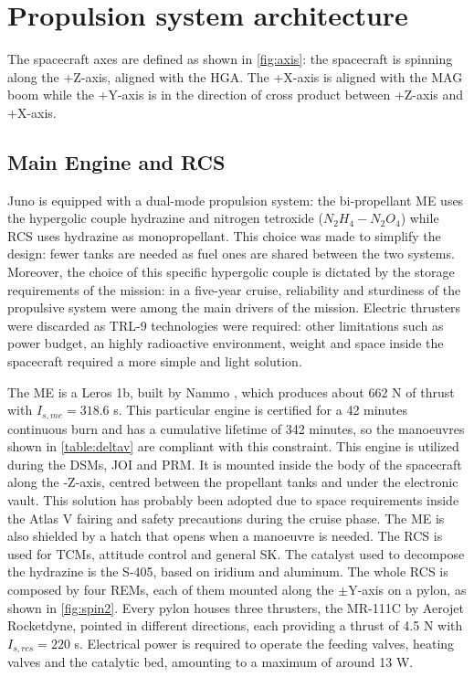 \section{Propulsion system architecture}
\label{sec:prop_architecture}

The spacecraft axes are defined as shown in \autoref{fig:axis}: the spacecraft is spinning along the +Z-axis, aligned with the HGA. The +X-axis is aligned with the MAG boom while the +Y-axis is in the direction of cross product between +Z-axis and +X-axis.


\subsection{Main Engine and RCS}
\label{subsec:me_rcs}

Juno is equipped with a dual-mode propulsion system: the bi-propellant ME uses the hypergolic couple hydrazine and nitrogen tetroxide ($N_2H_4 - N_2O_4$) while RCS uses hydrazine as monopropellant. This choice was made to simplify the design: fewer tanks are needed as fuel ones are shared between the two systems. Moreover, the choice of this specific hypergolic couple is dictated by the storage requirements of the mission: in a five-year cruise, reliability and sturdiness of the propulsive system were among the main drivers of the mission. Electric thrusters were discarded as TRL-9 technologies were required: other limitations such as power budget, an highly radioactive environment, weight and space inside the spacecraft required a more simple and light solution. 

The ME is a Leros 1b, built by Nammo \cite{Leros}, which produces about 662 N of thrust with $I_{s,me} = 318.6$ s. This particular engine is certified for a 42 minutes continuous burn and has a cumulative lifetime of 342 minutes, so the manoeuvres shown in \autoref{table:deltav} are compliant with this constraint. This engine is utilized during the DSMs, JOI and PRM. It is mounted inside the body of the spacecraft along the -Z-axis, centred between the propellant tanks and under the electronic vault. This solution has probably been adopted due to space requirements inside the Atlas V fairing and safety precautions during the cruise phase. The ME is also shielded by a hatch that opens when a manoeuvre is needed.
The RCS is used for TCMs, attitude control and general SK. The catalyst used to decompose the hydrazine is the S-405, based on iridium and aluminum\cite{s405}.
The whole RCS is composed by four REMs, each of them mounted along the $\pm$Y-axis on a pylon, as shown in \autoref{fig:spin2}. Every pylon houses three thrusters, the MR-111C by Aerojet Rocketdyne\cite{RCS_info}, pointed in different directions, each providing a thrust of 4.5 N with $I_{s,rcs} = 220$ s. Electrical power is required to operate the feeding valves, heating valves and the catalytic bed, amounting to a maximum of around 13 W\cite{RCS_values}. 

